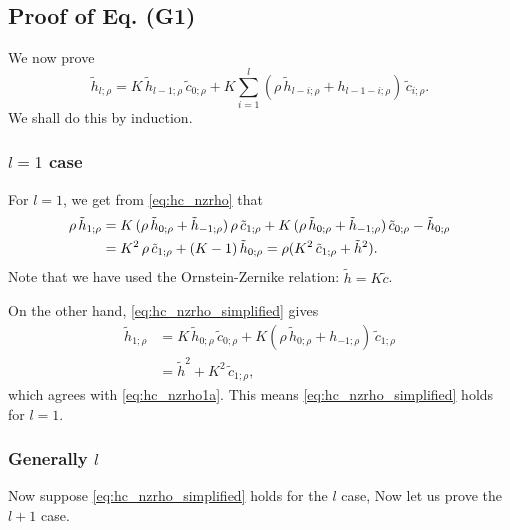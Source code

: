 \documentclass[preprint]{revtex4-1}
\numberwithin{equation}{subsection}
\numberwithin{table}{section}
\begin{document}
\subsection{Proof of Eq. (G1)}

We now prove
\begin{equation}
  \tilde h_{l;\rho}
=
  K \, \tilde h_{l-1;\rho} \, \tilde c_{0;\rho}
+
  K \sum_{i = 1}^l (\rho \, \tilde h_{l - i;\rho} + h_{l-1-i;\rho} ) \, \tilde c_{i;\rho}.
  \label{eq:hc_nzrho_simplified}
\end{equation}
We shall do this by induction.



\subsubsection{$l=1$ case}

For $l = 1$,
we get from \eqref{eq:hc_nzrho} that
\begin{align}
\rho \, \tilde h_{1;\rho}
&=
  K \, (\rho \, \tilde h_{0;\rho} + \tilde h_{-1;\rho}) \,
  \rho \, \tilde c_{1;\rho}
+
  K \, (\rho \, \tilde h_{0;\rho} + \tilde h_{-1;\rho}) \,
  \tilde c_{0;\rho}
-
  \tilde h_{0;\rho}
\notag
\\
&=
  K^2 \,
  \rho \, \tilde c_{1;\rho}
+
  (K - 1) \, \tilde h_{0;\rho}
=
\rho (K^2 \, \tilde c_{1;\rho} + \tilde h^2 ).
\label{eq:hc_nzrho1a}
\end{align}
Note that we have used the Ornstein-Zernike relation: $\tilde h = K \tilde c$.

On the other hand, \eqref{eq:hc_nzrho_simplified}
gives
\begin{align}
  \tilde h_{1;\rho}
&=
  K \, \tilde h_{0;\rho} \, \tilde c_{0;\rho}
+
  K (\rho \, \tilde h_{0;\rho} + h_{-1;\rho} ) \, \tilde c_{1;\rho}
\\
&=
  \tilde h^2 + K^2 \, \tilde c_{1;\rho},
\label{eq:hc_nzrho1b}
\end{align}
which agrees with \eqref{eq:hc_nzrho1a}.
%
This means \eqref{eq:hc_nzrho_simplified}
holds for $l = 1$.




\subsubsection{Generally $l$}


Now suppose \eqref{eq:hc_nzrho_simplified}
holds for the $l$ case,
%
Now let us prove the $l + 1$ case.
\end{document}

